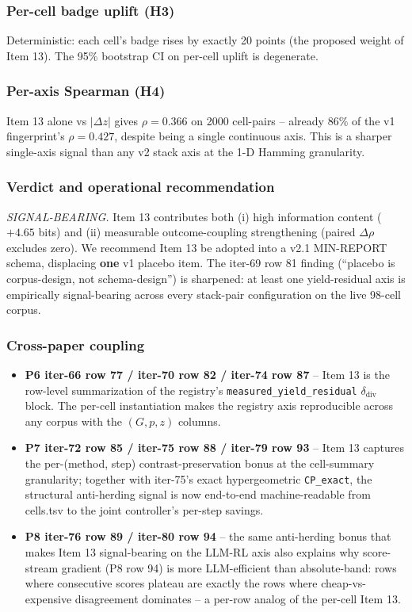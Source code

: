 \documentclass{article}  \usepackage[preprint,nonatbib]{neurips_2026} \usepackage[numbers]{natbib}
\begin{document}
\subsubsection{Per-cell badge uplift (H3)}
Deterministic: each cell's badge rises by exactly 20 points (the proposed
weight of Item 13). The 95\% bootstrap CI on per-cell uplift is degenerate.

\subsubsection{Per-axis Spearman (H4)}
Item 13 alone vs $|\Delta z|$ gives $\rho = 0.366$ on 2000 cell-pairs --
already 86\% of the v1 fingerprint's $\rho = 0.427$, despite being a
single continuous axis. This is a sharper single-axis signal than any
v2 stack axis at the 1-D Hamming granularity.

\subsubsection{Verdict and operational recommendation}
\textit{SIGNAL-BEARING.} Item 13 contributes both
(i) high information content ($+4.65$ bits) and
(ii) measurable outcome-coupling strengthening (paired $\Delta\rho$ excludes zero).
We recommend Item 13 be adopted into a v2.1 MIN-REPORT schema, displacing
\textbf{one} v1 placebo item. The iter-69 row 81 finding (``placebo is
corpus-design, not schema-design'') is sharpened: at least one
yield-residual axis is empirically signal-bearing across every stack-pair
configuration on the live 98-cell corpus.

\subsubsection{Cross-paper coupling}
\begin{itemize}
  \item \textbf{P6 iter-66 row 77 / iter-70 row 82 / iter-74 row 87} --
        Item 13 is the row-level summarization of the registry's
        \texttt{measured\_yield\_residual} $\delta_{\mathrm{div}}$ block.
        The per-cell instantiation makes the registry axis reproducible
        across any corpus with the $(G, p, z)$ columns.
  \item \textbf{P7 iter-72 row 85 / iter-75 row 88 / iter-79 row 93} --
        Item 13 captures the per-(method, step) contrast-preservation bonus
        at the cell-summary granularity; together with iter-75's exact
        hypergeometric \texttt{CP\_exact}, the structural anti-herding signal
        is now end-to-end machine-readable from cells.tsv to the joint
        controller's per-step savings.
  \item \textbf{P8 iter-76 row 89 / iter-80 row 94} -- the same
        anti-herding bonus that makes Item 13 signal-bearing on the LLM-RL
        axis also explains why score-stream gradient (P8 row 94) is more
        LLM-efficient than absolute-band: rows where consecutive scores
        plateau are exactly the rows where cheap-vs-expensive disagreement
        dominates -- a per-row analog of the per-cell Item 13.
\end{itemize}
\end{document}

